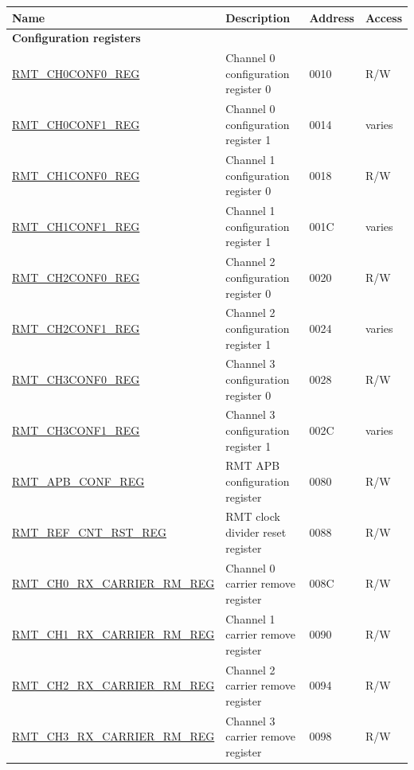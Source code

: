 \begin{longtable}{ | p{5.5cm} | p{7cm} | p{1.5cm} | p{1cm} | }
\hline\rowcolor{lightgray}
Name & Description &  Address & Access \\ \hline
\endhead
\multicolumn{4}{|l|}{\textbf{Configuration registers}} \\ \hline
\hyperref[regdesc:RMTCHNCONF0REG]{RMT\_CH0CONF0\_REG} & Channel 0 configuration register 0 & \hexprefix{}0010 & R/W \\ \hline
\hyperref[regdesc:RMTCHNCONF1REG]{RMT\_CH0CONF1\_REG} & Channel 0 configuration register 1 & \hexprefix{}0014 & varies \\ \hline
\hyperref[regdesc:RMTCHNCONF0REG]{RMT\_CH1CONF0\_REG} & Channel 1 configuration register 0 & \hexprefix{}0018 & R/W \\ \hline
\hyperref[regdesc:RMTCHNCONF1REG]{RMT\_CH1CONF1\_REG} & Channel 1 configuration register 1 & \hexprefix{}001C & varies \\ \hline
\hyperref[regdesc:RMTCHNCONF0REG]{RMT\_CH2CONF0\_REG} & Channel 2 configuration register 0 & \hexprefix{}0020 & R/W \\ \hline
\hyperref[regdesc:RMTCHNCONF1REG]{RMT\_CH2CONF1\_REG} & Channel 2 configuration register 1 & \hexprefix{}0024 & varies \\ \hline
\hyperref[regdesc:RMTCHNCONF0REG]{RMT\_CH3CONF0\_REG} & Channel 3 configuration register 0 & \hexprefix{}0028 & R/W \\ \hline
\hyperref[regdesc:RMTCHNCONF1REG]{RMT\_CH3CONF1\_REG} & Channel 3 configuration register 1 & \hexprefix{}002C & varies \\ \hline
\hyperref[regdesc:RMTAPBCONFREG]{RMT\_APB\_CONF\_REG} & RMT APB configuration register & \hexprefix{}0080 & R/W \\ \hline
\hyperref[regdesc:RMTREFCNTRSTREG]{RMT\_REF\_CNT\_RST\_REG} & RMT clock divider reset register & \hexprefix{}0088 & R/W \\ \hline
\hyperref[regdesc:RMTCHNRXCARRIERRMREG]{RMT\_CH0\_RX\_CARRIER\_RM\_REG} & Channel 0 carrier remove register & \hexprefix{}008C & R/W \\ \hline
\hyperref[regdesc:RMTCHNRXCARRIERRMREG]{RMT\_CH1\_RX\_CARRIER\_RM\_REG} & Channel 1 carrier remove register & \hexprefix{}0090 & R/W \\ \hline
\hyperref[regdesc:RMTCHNRXCARRIERRMREG]{RMT\_CH2\_RX\_CARRIER\_RM\_REG} & Channel 2 carrier remove register & \hexprefix{}0094 & R/W \\ \hline
\hyperref[regdesc:RMTCHNRXCARRIERRMREG]{RMT\_CH3\_RX\_CARRIER\_RM\_REG} & Channel 3 carrier remove register & \hexprefix{}0098 & R/W \\ \hline

\end{longtable}
